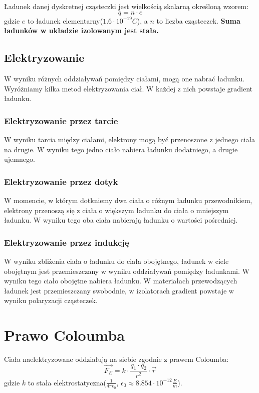 \documentclass{../notatki}
\begin{document}
Ładunek danej dyskretnej cząsteczki jest wielkością skalarną określoną wzorem:
$$
q = n \cdot e
$$
gdzie $e$ to ładunek elementarny($1.6 \cdot 10^{-19} C$), a $n$ to liczba
cząsteczek.
\textbf{Suma ładunków w układzie izolowanym jest stała.}

\subsection{Elektryzowanie}

W wyniku różnych oddziaływań pomiędzy ciałami, mogą one nabrać
ładunku. Wyróżniamy
kilka metod elektryzowania ciał. W każdej z nich powstaje gradient ładunku.

\subsubsection{Elektryzowanie przez tarcie}

W wyniku tarcia między ciałami, elektrony mogą być przenoszone z
jednego ciała na
drugie. W wyniku tego jedno ciało nabiera ładunku dodatniego, a drugie ujemnego.

\subsubsection{Elektryzowanie przez dotyk}

W momencie, w którym dotkniemy dwa ciała o różnym ładunku
przewodnikiem, elektrony
przenoszą się z ciała o większym ładunku do ciała o mniejszym
ładunku. W wyniku tego
oba ciała nabierają ładunku o wartości pośredniej.

\subsubsection{Elektryzowanie przez indukcję}

W wyniku zbliżenia ciała o ładunku do ciała obojętnego, ładunek
w ciele obojętnym jest przemieszczany w wyniku oddziaływań pomiędzy
ładunkami. W wyniku tego ciało obojętne nabiera ładunku. W materiałach
przewodzących ładunek jest przemieszczany swobodnie, w izolatorach gradient
powstaje w wyniku polaryzacji cząsteczek.

\section{Prawo Coloumba}

Ciała naelektryzowane oddziałują na siebie zgodnie z prawem Coloumba:
$$
\vec{F_E} = k \cdot \frac{q_1 \cdot q_2}{r^2} \cdot \vec{r}
$$
gdzie $k$ to stała elektrostatyczna($\frac{1}{4\pi\epsilon_0}$,
$\epsilon_0\approx8.854\cdot10^{-12}\frac{E}{m}$).
\end{document}

